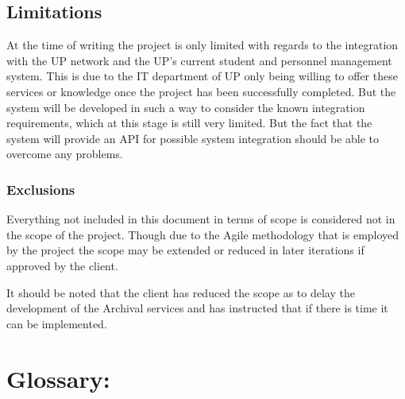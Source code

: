 \documentclass[12pt]{article}
\begin{document}
\vspace{0.2in}
\subsection{Limitations}
\vspace{0.2in}
At the time of writing the project is only limited with regards to the integration with the UP network and the UP's current student and personnel management system. This is due to the IT department of UP only being willing to offer these services or knowledge once the project has been successfully completed. But the system will be developed in such a way to consider the known integration requirements, which at this stage is still very limited. But the fact that the system will provide an API for possible system integration should be able to overcome any problems. 

\subsubsection{Exclusions}
\vspace{0.2in}
Everything not included in this document in terms of scope is considered not in the scope of the project. Though due to the Agile methodology that is employed by the project the scope may be extended or reduced in later iterations if approved by the client.

It should be noted that the client has reduced the scope as to delay the development of the Archival services and has instructed that if there is time it can be implemented.
\vspace{0.2in}

\newpage
\section{Glossary:}
\vspace{0.2in}
\end{document}
